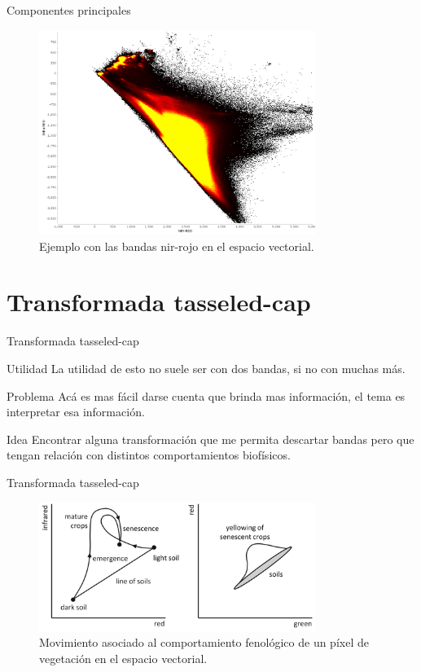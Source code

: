 \documentclass[handout]{beamer}
\begin{document}
\begin{frame}{Componentes principales}
  \begin{figure}
  \centering
  \includegraphics[width=0.8\textwidth]{imagenes/pca2.png}
  \caption{Ejemplo con las bandas nir-rojo en el espacio vectorial.}
  \end{figure}
\end{frame}

\section{Transformada tasseled-cap}

\begin{frame}{Transformada tasseled-cap}
  \begin{block}{Utilidad}
    La utilidad de esto no suele ser con dos bandas, si no con muchas más.
  \end{block}\pause
  \begin{block}{Problema}
    Acá es mas fácil darse cuenta que brinda mas información, el tema es interpretar esa información.
  \end{block}\pause
  \begin{block}{Idea}
    Encontrar alguna transformación que me permita descartar bandas pero que tengan relación con distintos comportamientos biofísicos.
  \end{block}
\end{frame}

\begin{frame}{Transformada tasseled-cap}
  \begin{figure}
  \centering
  \includegraphics[width=0.8\textwidth]{imagenes/tc.png}
  \caption{Movimiento asociado al comportamiento fenológico de un píxel de vegetación en el espacio vectorial.}
  \end{figure}
\end{frame}
\end{document}
